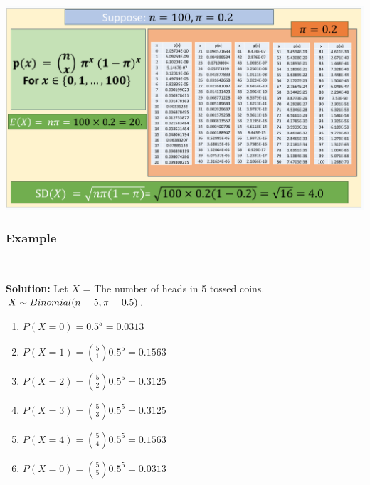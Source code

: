 \documentclass[compress]{beamer}
\begin{document}
\begin{frame}
\vspace{-.1in}
\begin{center}
\includegraphics[scale=.45]{figs/BinomialExpectedValue.png}
\end{center}
\vspace{1in}
\end{frame}



\begin{frame}\frametitle{Example}
\vspace{-.1in}
\\
\pause
\vspace{.1in}
{\tiny 
{\bf Solution: }
Let $X$ = The number of heads in 5 tossed coins. $X\sim Binomial(n=5, \pi=0.5)$.
\begin{enumerate}
\item $P(X = 0) =0.5^5 = 0.0313$
\item $P(X = 1) ={5 \choose 1}0.5^5 =0.1563$
\item $P(X = 2) ={5 \choose 2}0.5^5 =0.3125$
\item $P(X = 3) ={5 \choose 3}0.5^5 =0.3125$
\item $P(X = 4) ={5 \choose 4}0.5^5 =0.1563$
\item $P(X = 0) ={5 \choose 5}0.5^5 = 0.0313$
\end{enumerate}
}
\end{frame}
\end{document}
